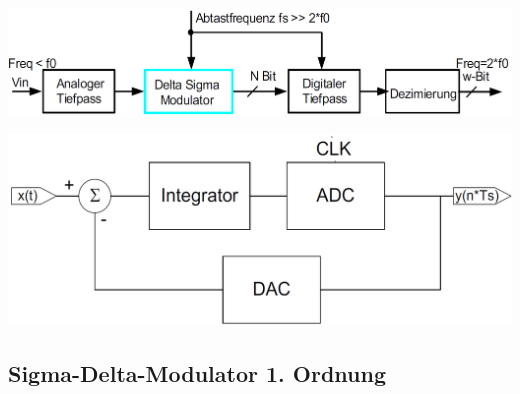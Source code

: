 \begin{minipage}[t]{0.6\columnwidth}
    \begin{center}
    \end{center}
    \includegraphics[width=\columnwidth]{images/aufbau_sigma_delta_ADC.png}
\end{minipage}
\hfill
\begin{minipage}[t]{0.38\columnwidth}
    \begin{center}
    \end{center}
    \includegraphics[width=\columnwidth]{images/aufbau_sigma_delta_modulator.png}
\end{minipage}


\subsection{Sigma-Delta-Modulator 1. Ordnung}


